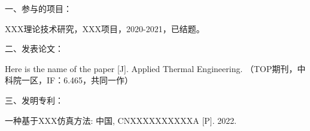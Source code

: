 %
% 
%


\noindent %
一、参与的项目：
\begingroup
\setlength{\itemsep}{0bp}\setlength{\parskip}{0pt}
    \begin{enumerate}[label={[\arabic*]}] %
        \item XXX理论技术研究，XXX项目，2020-2021，已结题。
        \end{enumerate}
\endgroup
\vspace{3mm}

\noindent %
二、发表论文：
\begingroup
\setlength{\itemsep}{0bp}\setlength{\parskip}{0pt}
    \begin{enumerate}[label={[\arabic*]}] 
        \item Here is the name of the paper [J]. Applied Thermal Engineering. （TOP期刊，中科院一区，IF：6.465，共同一作）
    \end{enumerate}
\endgroup
\vspace{3mm}

\noindent %
三、发明专利：
\begingroup
\setlength{\itemsep}{0bp}\setlength{\parskip}{0pt}
    \begin{enumerate}[label={[\arabic*]}]  
        \item 一种基于XXX仿真方法: 中国, CNXXXXXXXXXXA [P]. 2022. 
    \end{enumerate}
\endgroup
\vspace{3mm}

